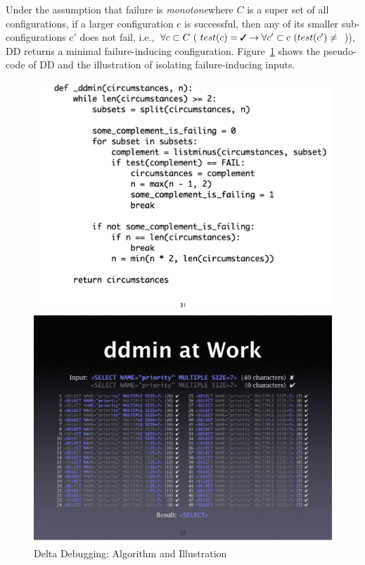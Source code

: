 Under the assumption that failure is {\em monotone}\textemdash where $C$ is a super set of all configurations, if a larger configuration $c$ is successful, then any of its smaller sub-configurations $c'$ does not fail, i.e., $\forall c \subset C\ (\ test(c)=\text{\cmark} \rightarrow \forall c' \subset c \  (test(c') \neq$ )), DD returns a minimal failure-inducing configuration. Figure~\ref{fig:deltadebugging} shows the pseudo-code of DD and the illustration of isolating failure-inducing inputs. 

\begin{figure}
\centering
\begin{minipage}{.48\textwidth}
  \centering
\includegraphics[width=1\textwidth]{images/DeltaDebugging.pdf}
\end{minipage}
\begin{minipage}{.48\textwidth}
  \centering
\includegraphics[width=1\textwidth]{images/DeltaDebuggingIlustration.pdf}
\end{minipage}
\caption{Delta Debugging: Algorithm and Illustration} 
\label{fig:deltadebugging} 
\end{figure}


